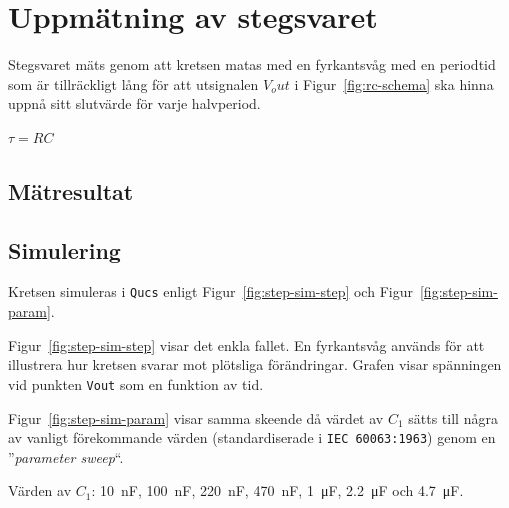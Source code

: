 %
%

\section{Uppmätning av stegsvaret}\label{step}
Stegsvaret mäts genom att kretsen matas med en fyrkantsvåg med en periodtid som
är tillräckligt lång för att utsignalen $V_out$ i Figur~\ref{fig:rc-schema} ska 
hinna uppnå sitt slutvärde för varje halvperiod.


$\tau = RC$

\subsection{Mätresultat}\label{}


\subsection{Simulering}\label{}
Kretsen simuleras i \texttt{Qucs} enligt Figur~\ref{fig:step-sim-step} och
Figur~\ref{fig:step-sim-param}.

Figur~\ref{fig:step-sim-step} visar det enkla fallet. En fyrkantsvåg används
för att illustrera hur kretsen svarar mot plötsliga förändringar. Grafen visar
spänningen vid punkten \texttt{Vout} som en funktion av tid.

Figur~\ref{fig:step-sim-param} visar samma skeende då värdet av $C_1$ sätts
till några av vanligt förekommande värden (standardiserade i \texttt{IEC
60063:1963}) genom en ''\emph{parameter sweep}``.  \par 
Värden av $C_1$: \SI{10}{\nano\farad},  \SI{100}{\nano\farad},
                 \SI{220}{\nano\farad}, \SI{470}{\nano\farad}, 
                 \SI{1}{\micro\farad},  \SI{2.2}{\micro\farad} 
             och \SI{4.7}{\micro\farad}.


